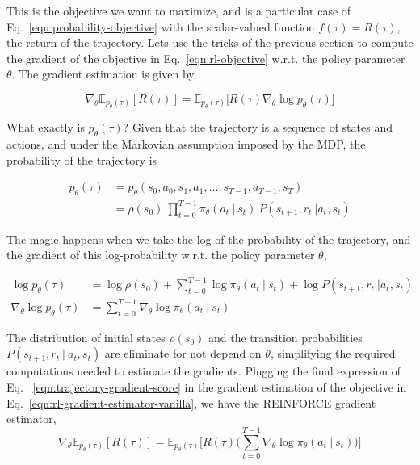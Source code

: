 This is the objective we want to maximize, and is a 
particular case of Eq.~\ref{eqn:probability-objective} with the
scalar-valued function $f(\tau) = R(\tau)$, the return of the trajectory. 
Lets use the tricks of the previous section to compute the
gradient of the objective in Eq.~\ref{eqn:rl-objective} w.r.t. the policy
parameter $\theta$. The gradient estimation is given by,

\begin{equation}\label{eqn:rl-gradient-estimator-vanilla}
    \nabla_{\theta} \mathbb{E}_{p_{\theta}(\tau)}[R(\tau)] = \mathbb{E}_{p_{\theta}(\tau)}\big[R(\tau)\nabla_{\theta}\log p_{\theta}(\tau)\big]
\end{equation}    

What exactly is $p_{\theta}(\tau)$? Given that the trajectory is a sequence of
states and actions, and under the Markovian assumption imposed by the MDP, the
probability of the trajectory is 

\begin{equation}\label{eqn:trajectory-probability-expanded}
    \begin{split}
        p_{\theta}(\tau) &= p_\theta(s_{0}, a_{0}, s_{1}, a_{1}, \dots, s_{T-1}, a_{T-1}, s_{T}) \\
        &= \rho(s_0)~\prod_{t=0}^{T-1} \pi_{\theta}(a_{t}~|~s_{t})~P(s_{t+1}, r_{t}~|a_{t}, s_{t})
    \end{split}
\end{equation}

The magic happens when we take the log of the probability of the trajectory, and
the gradient of this log-probability w.r.t. the policy parameter $\theta$,

\begin{equation}\label{eqn:trajectory-gradient-score}
    \begin{split}
        \log p_{\theta}(\tau) &= \log \rho(s_0) + \sum_{t=0}^{T-1}\log \pi_{\theta}(a_{t}~|~s_{t}) + \log P(s_{t+1}, r_{t}~|a_{t}, s_{t}) \\
        \nabla_{\theta}\log p_{\theta}(\tau) &= \sum_{t=0}^{T-1}\nabla_{\theta}\log \pi_{\theta}(a_{t}~|~s_{t})
    \end{split}
\end{equation}

The distribution of initial states $\rho(s_{0})$ and the transition
probabilities $P(s_{t+1}, r_{t}~|~a_{t}, s_{t})$ are eliminate for not depend
on $\theta$, simplifying the required computations needed to estimate the
gradients. Plugging the final expression of Eq.~
\ref{eqn:trajectory-gradient-score} in the gradient estimation of the objective
in Eq.~\ref{eqn:rl-gradient-estimator-vanilla}, we have the REINFORCE gradient
estimator,
\begin{equation}\label{eqn:reinforce-gradient-estimator}
    \nabla_{\theta}\mathbb{E}_{p_{\theta}(\tau)}[R(\tau)] = \mathbb{E}_{p_{\theta}(\tau)}\bigg[R(\tau)\bigg(\sum_{t=0}^{T-1} \nabla_{\theta}\log \pi_{\theta} (a_t~|~s_t) \bigg)\bigg] 
\end{equation}

